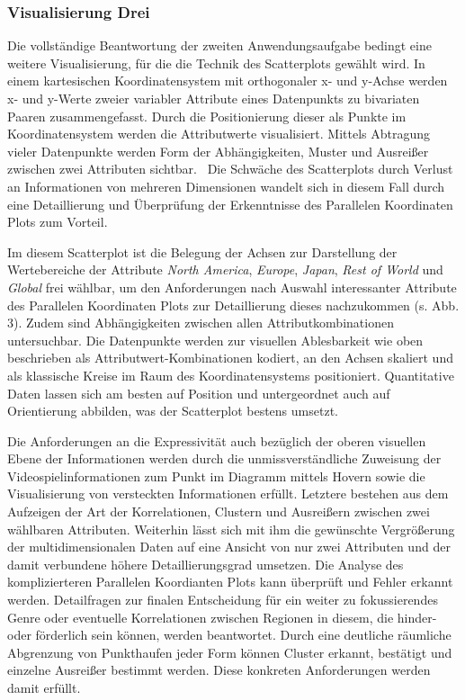 \documentclass[usegeometry=true]{scrartcl}
\begin{document}
\subsubsection{Visualisierung Drei}
Die vollständige Beantwortung der zweiten Anwendungsaufgabe bedingt eine weitere Visualisierung, für die die Technik des Scatterplots gewählt wird.
In einem kartesischen Koordinatensystem mit orthogonaler x- und y-Achse werden x- und y-Werte 
zweier variabler Attribute eines Datenpunkts zu bivariaten Paaren zusammengefasst.
Durch die Positionierung dieser als Punkte im Koordinatensystem werden die Attributwerte visualisiert.\cite[103]{Friendly.2005}
Mittels Abtragung vieler Datenpunkte werden Form der Abhängigkeiten, Muster und Ausreißer zwischen zwei Attributen sichtbar.\cite[9]{Chan.2006}~\cite[103]{Friendly.2005}
Die Schwäche des Scatterplots durch Verlust an Informationen von mehreren Dimensionen wandelt sich in diesem Fall durch eine Detaillierung und Überprüfung der Erkenntnisse des Parallelen Koordinaten Plots zum Vorteil.\cite[9]{Chan.2006}~\cite[93]{Wegman.1997}

Im diesem Scatterplot ist die Belegung der Achsen zur Darstellung der Wertebereiche der Attribute \textit{North America}, \textit{Europe}, \textit{Japan}, \textit{Rest of World} und \textit{Global} frei wählbar, 
um den Anforderungen nach Auswahl interessanter Attribute des Parallelen Koordinaten Plots zur Detaillierung dieses nachzukommen (s. Abb. 3).
Zudem sind Abhängigkeiten zwischen allen Attributkombinationen untersuchbar. 
Die Datenpunkte werden zur visuellen Ablesbarkeit wie oben beschrieben als Attributwert-Kombinationen kodiert, 
an den Achsen skaliert und als klassische Kreise im Raum des Koordinatensystems positioniert. 
Quantitative Daten lassen sich am besten auf Position und untergeordnet auch auf Orientierung abbilden, 
was der Scatterplot bestens umsetzt.\cite{Bertin.1982}

Die Anforderungen an die Expressivität auch bezüglich der oberen visuellen Ebene der Informationen werden durch die 
unmissverständliche Zuweisung der Videospielinformationen zum Punkt im Diagramm mittels Hovern sowie die Visualisierung von versteckten Informationen erfüllt. 
Letztere bestehen aus dem Aufzeigen der Art der Korrelationen, Clustern und Ausreißern zwischen zwei wählbaren Attributen.
Weiterhin lässt sich mit ihm die gewünschte Vergrößerung der multidimensionalen Daten auf eine Ansicht von nur zwei Attributen und der damit verbundene höhere Detaillierungsgrad umsetzen. 
Die Analyse des komplizierteren Parallelen Koordianten Plots kann überprüft und Fehler erkannt werden. 
Detailfragen zur finalen Entscheidung für ein weiter zu fokussierendes Genre oder eventuelle Korrelationen zwischen Regionen in diesem, 
die hinder- oder förderlich sein können, werden beantwortet. 
Durch eine deutliche räumliche Abgrenzung von Punkthaufen jeder Form können Cluster erkannt, bestätigt und einzelne Ausreißer bestimmt werden.
Diese konkreten Anforderungen werden damit erfüllt.
\end{document}
